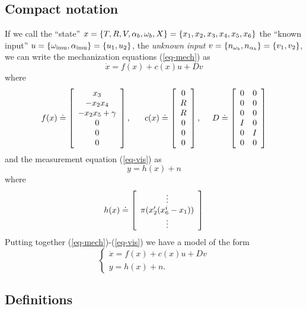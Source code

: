 \subsection{Compact notation}
If we call the ``state'' $x = \{T, R, V, \alpha_b, \w_b, X\} = \{x_1, x_2, x_3, x_4, x_5, x_6\}$ the ``known input'' $u = \{\w\imu , \alpha\imu \} = \{u_1, u_2\}$, the {\em unknown input} $v = \{ n_{\w_b}, n_{\alpha_b} \} = \{v_1, v_2\}$, we can write the mechanization equations (\ref{eq-mech}) as
\begin{equation}
\dot x = f(x) + c(x) u + D v
\label{eq-mod0}
\end{equation}
where 
\begin{equation}
f(x) \doteq \ba{c} x_3 \\ -x_2 x_4 \\ -x_2 x_5 + \gamma \\ 0 \\0 \\ 0 \ea, ~~~~~ c(x) \doteq \ba{c} 0 \\ R \\ R \\ 0 \\ 0 \\ 0\ea, ~~~~ D \doteq \ba{cc} 0 & 0\\ 0 & 0  \\ 0 & 0 \\ I & 0 \\ 0 & I \\ 0 & 0\ea
\end{equation}
and the measurement equation (\ref{eq-vis}) as
\begin{equation}
y = h(x)+n
\end{equation}
where
\begin{equation}
h(x) \doteq \ba{c} \vdots \\ \pi(x_2'(x_6^i - x_1)) \\ \vdots \ea
\end{equation}
Putting together (\ref{eq-mech})-(\ref{eq-vis}) we have a model of the form
\begin{equation}
\boxed{\begin{cases}
\dot x = f(x) + c(x) u + D v \\
y = h(x) + n.
\end{cases}}
\label{eq-fg}
\end{equation}

\subsection{Definitions}

